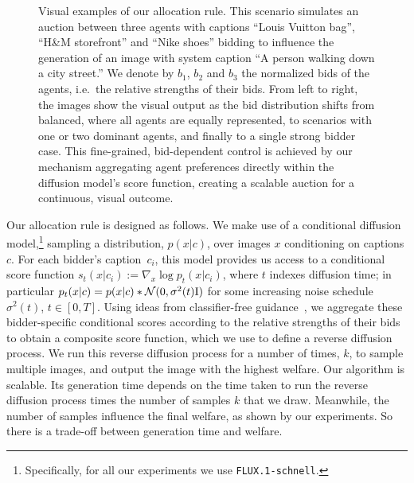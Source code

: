 \documentclass[format=acmsmall, review=false]{acmart}
\begin{document}
\begin{figure}[h!]
\begin{subfigure}[b]{0.193\textwidth}
    \end{subfigure}
    
    \caption*{Sampled images for $3$ agents with captions ``Louis Vuitton bag'', ``H\&M storefront'' and ``Nike shoes'' and (normalized) bids $b_1$, $b_2$ and $b_3$ respectively, for different choices of $(b_1,b_2,b_3)$.}
    \caption{Visual examples of our allocation rule. This scenario simulates an auction between three agents with captions ``Louis Vuitton bag'', ``H\&M storefront'' and ``Nike shoes'' bidding to influence the generation of an image with system caption ``A person walking down a city street.'' We denote by $b_1$, $b_2$ and $b_3$ the normalized bids of the agents, i.e.~the relative strengths of their bids. From left to right, the images show the visual output as the bid distribution shifts from balanced, where all agents are equally represented, to scenarios with one or two dominant agents, and finally to a single strong bidder case. This fine-grained, bid-dependent control is achieved by our mechanism aggregating agent preferences directly within the diffusion model's score function, creating a scalable auction for a continuous, visual outcome.}
    \label{fig:grid_images_3_agents}
\end{figure}

  \noindent Our allocation rule is designed as follows. We make use of a conditional diffusion model,\footnote{Specifically, for all our experiments we use \texttt{FLUX.1-schnell}.} sampling a distribution, $p(x|c)$, over images $x$ conditioning on captions $c$. For each bidder's caption~$c_i$, this model provides us  access to a conditional score function $s_t(x|c_i):=\nabla_x \log p_t(x|c_i)$, where $t$ indexes diffusion time; in particular $p_t(x|c) = p(x|c) \ast {\mathcal N}(0,\sigma^2(t){\rm I})$ for some increasing noise schedule $\sigma^2(t)$, $t\in [0,T]$. Using ideas from classifier-free guidance~\cite{ho2022cfg}, we aggregate these bidder-specific conditional scores according to the relative strengths of their bids to obtain a composite score function, which we use to define a reverse diffusion process. We run this reverse diffusion process for a number of times, $k$, to sample multiple images, and output the image with the highest welfare. Our algorithm is scalable. Its generation time depends on the time taken to run the reverse diffusion process times the number of samples $k$ that we draw. Meanwhile, the number of samples influence the final welfare, as shown by our experiments. So there is a trade-off between generation time and welfare.
    
\end{document}
